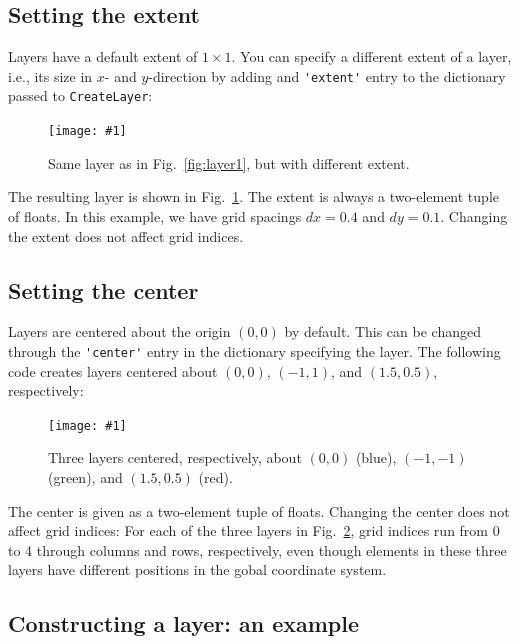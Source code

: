 \documentclass[a4paper,12pt]{report}
\newcommand{\scriptfig}[4]{%
\begin{figure}
\centerline{\texttt{[image: \#1]}}
\caption[#3]{#4}
\label{fig:#1}
\end{figure}%
}
\begin{document}
\subsection{Setting the extent}\label{sec:setextent}

Layers have a default extent of $1\times 1$. 
You can specify a different extent of a layer, i.e., its size in $x$- and
$y$-direction by adding and \lstinline!'extent'! entry to the
dictionary passed to \lstinline!CreateLayer!:
%

\scriptfig{layer2}{0.8}{Layer with non-standard extent}%
{Same layer as in Fig.~\ref{fig:layer1}, but with different extent.}
%
The resulting layer is shown in Fig.~\ref{fig:layer2}. The extent is
always a two-element tuple of floats. In this example, we have grid
spacings $dx=0.4$ and $dy=0.1$. Changing the extent does not affect
grid indices.

\subsection{Setting the center}\label{sec:setcenter}

Layers are centered about the origin $(0,0)$ by default. This can be
changed through the \lstinline!'center'! entry in the dictionary
specifying the layer. The following code creates layers centered about
$(0,0)$, $(-1,1)$, and $(1.5,0.5)$, respectively:
%

\scriptfig{layer3}{0.8}{Layers with different centers}%
{Three layers centered, respectively, about $(0,0)$ (blue), $(-1,-1)$
  (green), and $(1.5,0.5)$ (red).}
%
The center is given as a two-element tuple of floats.
Changing the center does not affect grid indices: For each of the
three layers in Fig.~\ref{fig:layer3}, grid indices run from 0 to 4
through columns and rows, respectively, even though elements in these
three layers have different positions in the gobal coordinate system.

\subsection{Constructing a layer: an example}\label{sec:fixedlayerexample}
\end{document}
